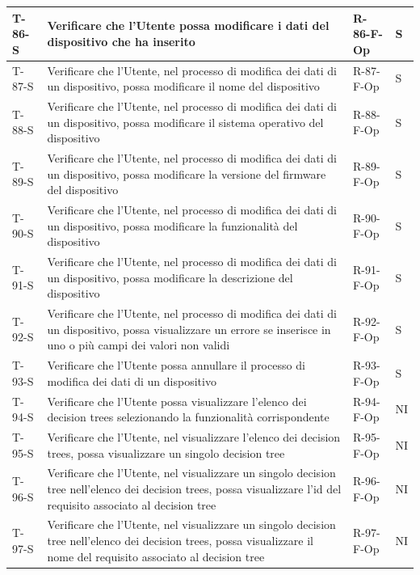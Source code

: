 \documentclass[a4paper,12pt]{article}
\begin{document}
{{\begin{longtable}{|p{}|p{}|p{}|p{}|}
                T-86-S & Verificare che l'Utente possa modificare i dati del dispositivo che ha inserito & R-86-F-Op & S \\ \hline
                T-87-S & Verificare che l'Utente, nel processo di modifica dei dati di un dispositivo, possa modificare il nome del dispositivo & R-87-F-Op & S \\ \hline
                T-88-S & Verificare che l'Utente, nel processo di modifica dei dati di un dispositivo, possa modificare il sistema operativo del dispositivo & R-88-F-Op & S \\ \hline
                T-89-S & Verificare che l'Utente, nel processo di modifica dei dati di un dispositivo, possa modificare la versione del firmware del dispositivo & R-89-F-Op & S \\ \hline
                T-90-S & Verificare che l'Utente, nel processo di modifica dei dati di un dispositivo, possa modificare la funzionalità del dispositivo & R-90-F-Op & S \\ \hline
                T-91-S & Verificare che l'Utente, nel processo di modifica dei dati di un dispositivo, possa modificare la descrizione del dispositivo & R-91-F-Op & S \\ \hline
                T-92-S & Verificare che l'Utente, nel processo di modifica dei dati di un dispositivo, possa visualizzare un errore se inserisce in uno o più campi dei valori non validi & R-92-F-Op & S \\ \hline
                T-93-S & Verificare che l'Utente possa annullare il processo di modifica dei dati di un dispositivo & R-93-F-Op & S \\ \hline
                T-94-S & Verificare che l'Utente possa visualizzare l'elenco dei decision trees selezionando la funzionalità corrispondente & R-94-F-Op & NI \\ \hline
                T-95-S & Verificare che l'Utente, nel visualizzare l'elenco dei decision trees, possa visualizzare un singolo decision tree & R-95-F-Op & NI \\ \hline
                T-96-S & Verificare che l'Utente, nel visualizzare un singolo decision tree nell'elenco dei decision trees, possa visualizzare l'id del requisito associato al decision tree & R-96-F-Op & NI \\ \hline
                T-97-S & Verificare che l'Utente, nel visualizzare un singolo decision tree nell'elenco dei decision trees, possa visualizzare il nome del requisito associato al decision tree & R-97-F-Op & NI \\ \hline

\end{longtable}}}
\end{document}
